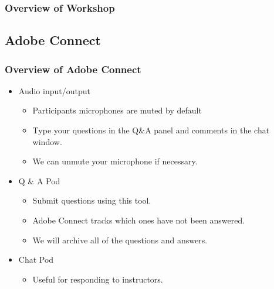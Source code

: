 \documentclass{beamer}
\begin{document}
\begin{frame}
  \frametitle{Overview of Workshop}
  
  

\end{frame}


\subsection{Adobe Connect}

\begin{frame}
  \frametitle{Overview of Adobe Connect}
 
  \begin{itemize}
  \item Audio input/output
    \begin{itemize}
    \item Participants microphones are muted by default
    \item Type your questions in the Q\&A panel and comments in the
      chat window.
    \item We can unmute your microphone if necessary.
    \end{itemize} 
  \item Q \& A Pod
    \begin{itemize}
    \item Submit questions using this tool.
    \item Adobe Connect tracks which ones have not been answered.
    \item We will archive all of the questions and answers.
    \end{itemize}
  \item Chat Pod
    \begin{itemize}
    \item Useful for responding to instructors.
    \end{itemize}
  \end{itemize}

\end{frame}
\end{document}
